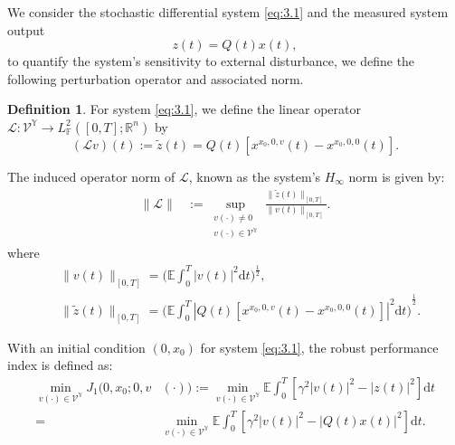 \documentclass[lettersize,journal]{IEEEtran}
\theoremstyle{plain}
\theoremstyle{definition}
\newtheorem{defn}[thm]{Definition}
\begin{document}
We consider the stochastic differential system \eqref{eq:3.1}
and the measured system output \[z(t) = Q(t)x(t),\] to quantify the system's sensitivity to external disturbance, we define the following perturbation operator and associated norm.

\begin{defn}\label{defn:4.1}
	For system \eqref{eq:3.1}, we define the linear operator $\mathcal{L} : \mathcal{V}^\mathbb{Y} \rightarrow L_\mathbb{F}^2 ([0,T];\mathbb{R}^{n})$ by
	\begin{equation*}
		(\mathcal{L}v)(t) := \widetilde{z}(t) = Q(t)[x^{x_0,0,v}(t) - x^{x_0,0,0}(t)].
	\end{equation*}
	
	The induced operator norm of $\mathcal{L}$, known as the system's $H_\infty$ norm is given by:
	\begin{equation*}
		\begin{aligned}
			\|\mathcal{L}\| &:= \sup_{\substack{v(\cdot) \neq 0 \\ v(\cdot) \in \mathcal{V}^{\mathbb{Y}}}} \frac{\|\widetilde{z}(t)\|_{[0,T]}}{\|v(t)\|_{[0,T]}}.
		\end{aligned}
	\end{equation*}
	where
	\begin{equation*}
		\begin{aligned}
			&\|v(t)\|_{[0,T]} = \Big({\mathbb{E}\int_0^T |v(t)|^2 \mathrm{d}t}\Big)^\frac{1}{2},\\
			&\|\widetilde{z}(t)\|_{[0,T]} = {\Big(\mathbb{E}\int_0^T |Q(t)[x^{x_0,0,v}(t) - x^{x_0,0,0}(t)]|^2 \mathrm{d}t \Big)}^\frac{1}{2}.
		\end{aligned}
	\end{equation*}
\end{defn}

With an initial condition $(0,x_0)$ for system \eqref{eq:3.1}, the robust performance index is defined as:
\begin{equation*}
	\begin{aligned}
		\min_{v(\cdot) \in \mathcal{V}^{\mathbb{Y}}} J_1(0,x_0;0,v&(\cdot)) :=\min_{v(\cdot) \in \mathcal{V}^{\mathbb{Y}}} \mathbb{E}\int_0^T [\gamma^2|v(t)|^2 - |z(t)|^2]\mathrm{d}t\\
		=&\min_{v(\cdot) \in \mathcal{V}^{\mathbb{Y}}} \mathbb{E}\int_0^T [\gamma^2|v(t)|^2 - |Q(t)x(t)|^2]\mathrm{d}t.
	\end{aligned}
\end{equation*}
\end{document}
